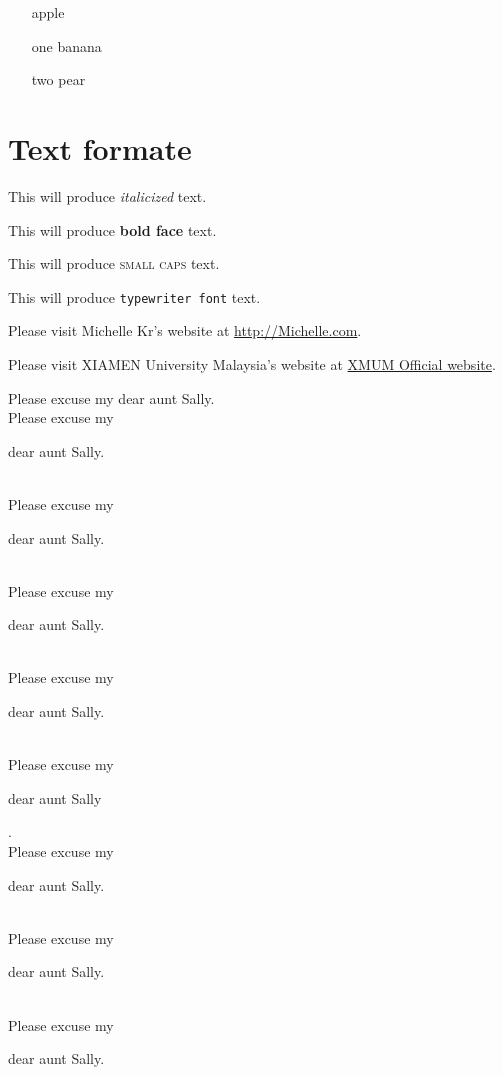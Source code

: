 \documentclass[12pt, a4paper]{article}
\begin{document}
\vspace{1cm}

\begin{enumerate}
    \item []apple
    \item [one]banana
    \item [two]pear
\end{enumerate}

\section{Text formate}

This will produce \textit{italicized} text.

This will produce \textbf{bold face} text.

This will produce \textsc{small caps} text.

This will produce \texttt{typewriter font} text.

Please visit Michelle Kr's website at 
\url{http://Michelle.com}.

Please visit XIAMEN University Malaysia's website at 
\href{https://www.xmu.edu.my/}{XMUM Official website}.

\vspace{2cm}

Please excuse my dear aunt Sally. \\
Please excuse my \begin{large}dear aunt Sally.\end{large} \\
Please excuse my \begin{Large}dear aunt Sally.\end{Large} \\
Please excuse my \begin{huge}dear aunt Sally.\end{huge} \\
Please excuse my \begin{Huge}dear aunt Sally.\end{Huge} \\
Please excuse my \begin{normalsize} dear aunt Sally\end{normalsize}. \\ 

Please excuse my \begin{small}dear aunt Sally.\end{small} \\
Please excuse my \begin{scriptsize}dear aunt Sally.\end{scriptsize} \\
Please excuse my \begin{tiny}dear aunt Sally.\end{tiny} \\
\end{document}
